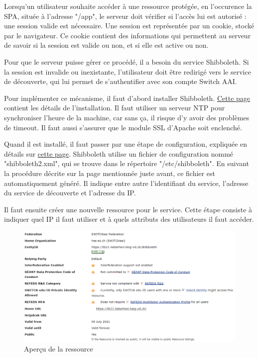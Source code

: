 \documentclass[
    iai, %
    eai, %
]{heig-tb}
\begin{document}
Lorsqu'un utilisateur souhaite accéder à une ressource protégée, en l'occurence la SPA, située à l'adresse "/app", le serveur doit vérifier si l'accès lui est autorisé : une session valide est nécessaire. Une session est représentée par un cookie, stocké par le navigateur. Ce cookie contient des informations qui permettent au serveur de savoir si la session est valide ou non, et si elle est active ou non.

Pour que le serveur puisse gérer ce procédé, il a besoin du service Shibboleth.
Si la session est invalide ou inexistante, l'utilisateur doit être redirigé vers le service de découverte, qui lui permet de s'authentifier avec son compte Switch AAI.


Pour implémenter ce mécanisme, il faut d'abord installer Shibboleth. \href{https://www.switch.ch/aai/guides/sp/installation/}{Cette page} contient les détails de l'installation.
Il faut utiliser un serveur NTP pour synchroniser l'heure de la machine, car sans ça, il risque d'y avoir des problèmes de timeout. Il faut aussi s'assurer que le module SSL d'Apache soit enclenché.

Quand il est installé, il faut passer par une étape de configuration, expliquée en détails sur \href{https://www.switch.ch/aai/guides/sp/configuration/}{cette page}.
Shibboleth utilise un fichier de configuration nommé "shibboleth2.xml", qui se trouve dans le répertoire "/etc/shibboleth". En suivant la procédure décrite sur la page mentionnée juste avant, ce fichier est automatiquement généré. Il indique entre autre l'identifiant du service, l'adresse du service de découverte et l'adresse du IP.

\newpage
Il faut ensuite créer une nouvelle ressource pour le service. Cette étape consiste à indiquer quel IP il faut utiliser et à quels attributs des utilisateurs il faut accéder.

\begin{figure}[h]
  \includegraphics[width=14cm]{registry1.PNG}
  \caption{Aperçu de la ressource}
\end{figure}
\end{document}
